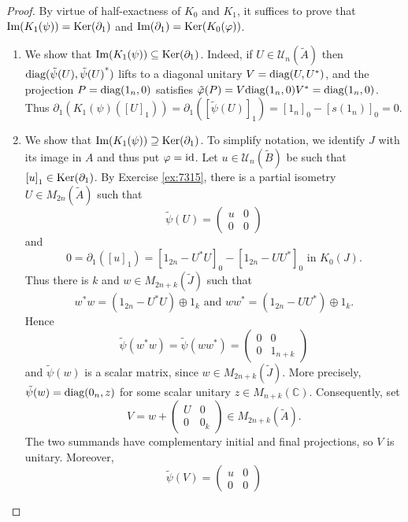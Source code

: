 \documentclass{book}
\def\diag{\textnormal{diag}}
\begin{document}
\begin{proof}
  By virtue of half-exactness of \(K_0\) and \(K_1\), it suffices to prove that \(\textnormal{Im}(K_1(\psi))=\textnormal{Ker}(\partial_1)\)
  and \(\textnormal{Im}(\partial_1)=\textnormal{Ker}(K_0(\varphi))\).
  \begin{enumerate}
    \item We show that \(\textnormal{Im}(K_1(\psi))\subseteq\textnormal{Ker}(\partial_1)\). Indeed, if \(U\in\mathcal{U}_n(\tilde{A})\) then
    \(\diag(\tilde{\psi}(U),{\tilde{\psi}(U)}^*)\) lifts to a diagonal unitary \(V=\diag(U,U^*)\), and the projection \(P=\diag(1_n,0)\) satisfies \(\tilde{\varphi}(P)=V\diag(1_n,0)V^*=\diag(1_n,0)\).
    Thus \(\partial_1(K_1(\psi)({[U]}_1))=\partial_1({[\tilde{\psi}(U)]}_1)={[1_n]}_0-{[s(1_n)]}_0=0\).
    \item We show that \(\textnormal{Im}(K_1(\psi))\supseteq\textnormal{Ker}(\partial_1)\). To simplify notation, we identify \(J\) with its image in \(A\) and thus put \(\varphi=\textnormal{id}\).
    Let \(u\in\mathcal{U}_n(\tilde{B})\) be such that \({[u]}_1\in\textnormal{Ker}(\partial_1)\). By Exercise \ref{ex:7315}, there is a partial isometry \(U\in M_{2n}(\tilde{A})\) such that
    \[
      \tilde{\psi}(U)=\begin{pmatrix}
        u&0\\0&0
      \end{pmatrix}
    \]
    and 
    \[
      0=\partial_1({[u]}_1)={[1_{2n}-U^*U]}_0-{[1_{2n}-UU^*]}_0\text{ in }K_0(J).
    \]
    Thus there is \(k\) and \(w\in M_{2n+k}(\tilde{J})\) such that
    \[
      w^*w=(1_{2n}-U^*U)\oplus 1_k\text{ and }ww^*=(1_{2n}-UU^*)\oplus 1_k.
    \]
    Hence
    \[
      \tilde{\psi}(w^*w)=\tilde{\psi}(ww^*)=\begin{pmatrix}
        0&0\\0&1_{n+k}
      \end{pmatrix}
    \]
    and \(\tilde{\psi}(w)\) is a scalar matrix, since \(w\in M_{2n+k}(\tilde{J})\). More precisely,
    \(\tilde{\psi}(w)=\diag(0_n,z)\) for some scalar unitary \(z\in M_{n+k}(\mathbb{C})\). Consequently,
    set
    \[
      V=w+\begin{pmatrix}
        U&0\\0&0_k
      \end{pmatrix}\in M_{2n+k}(\tilde{A}).
    \]
    The two summands have complementary initial and final projections, so \(V\) is unitary. Moreover,
    \[
      \tilde{\psi}(V)=\begin{pmatrix}
        u&0\\0&0

\end{pmatrix}\]
\end{enumerate}
\end{proof}
\end{document}
